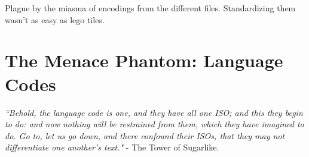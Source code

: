 \documentclass[11pt]{article}
\begin{document}
\noindent Plague by the miasma of encodings from the different files. Standardizing them wasn't as easy as lego tiles.

\section{The Menace Phantom: Language Codes}

\emph{``Behold, the language code is one, and they have all one ISO; and this they begin to do: and now nothing will be restrained from them, which they have imagined to do. Go to, let us go down, and there confound their ISOs, that they may not differentiate one another's text."} - The Tower of Sugarlike. \\

\
\\
\
\\

{}

\end{document}
